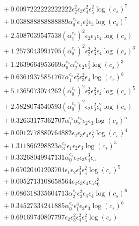 \documentclass[10pt]{article}
\begin{document}
\begin{align*}
&{}  + 0.0097222222222222 \epsilon_{2}^{2} \epsilon_{3} \epsilon_{4}^{2} \epsilon_{5}^{2} \log{\left(c_{s} \right)}^{7} \\
&{}  + 0.038888888888889 \alpha_{0}^{c_s} \epsilon_{1} \epsilon_{2}^{4} \epsilon_{3} \log{\left(c_{s} \right)}^{7} \\
&{}  + 2.5087039547538 \left(\alpha_{1}^{c_s}\right)^{2} \epsilon_{2} \epsilon_{3} \epsilon_{4} \log{\left(c_{s} \right)} \\
&{}  + 1.2573043991705 \left(\alpha_{0}^{c_s}\right)^{2} \epsilon_{2}^{2} \epsilon_{3}^{2} \epsilon_{4} \log{\left(c_{s} \right)}^{3} \\
&{}  + 1.2639664953669 \alpha_{0}^{c_s} \alpha_{2}^{c_s} \epsilon_{2} \epsilon_{3}^{2} \log{\left(c_{s} \right)}^{3} \\
&{}  + 0.63619375851767 \alpha_{1}^{c_s} \epsilon_{2}^{2} \epsilon_{3}^{2} \epsilon_{4} \log{\left(c_{s} \right)}^{6} \\
&{}  + 5.1365073074262 \left(\alpha_{0}^{c_s}\right)^{2} \epsilon_{2}^{2} \epsilon_{3}^{2} \epsilon_{4} \log{\left(c_{s} \right)}^{5} \\
&{}  + 2.5828074540593 \left(\alpha_{0}^{c_s}\right)^{2} \epsilon_{2} \epsilon_{3}^{2} \epsilon_{4}^{2} \log{\left(c_{s} \right)} \\
&{}  + 0.32633177362707 \alpha_{1}^{c_s} \alpha_{2}^{c_s} \epsilon_{2} \epsilon_{3} \log{\left(c_{s} \right)}^{5} \\
&{}  + 0.0012778880764882 \epsilon_{2} \epsilon_{3} \epsilon_{4} \epsilon_{5}^{4} \log{\left(c_{s} \right)}^{4} \\
&{}  + 1.311866298823 \alpha_{3}^{c_s} \epsilon_{1} \epsilon_{2} \epsilon_{3} \log{\left(c_{s} \right)}^{3} \\
&{}  + 0.33268049947131 \alpha_{0}^{c_s} \epsilon_{2} \epsilon_{3} \epsilon_{4}^{3} \epsilon_{5} \\
&{}  + 0.67020401203704 \epsilon_{1} \epsilon_{2} \epsilon_{3}^{3} \epsilon_{4}^{2} \log{\left(c_{s} \right)}^{5} \\
&{}  + 0.0052713108658564 \epsilon_{2} \epsilon_{3} \epsilon_{4} \epsilon_{5} \epsilon_{6}^{3} \\
&{}  + 0.086318335604713 \alpha_{2}^{c_s} \epsilon_{2}^{2} \epsilon_{3} \epsilon_{4} \log{\left(c_{s} \right)}^{6} \\
&{}  + 0.34527334241885 \alpha_{0}^{c_s} \epsilon_{1}^{4} \epsilon_{2} \epsilon_{3} \log{\left(c_{s} \right)}^{6} \\
&{}  + 0.69169740807797 \epsilon_{2} \epsilon_{3}^{2} \epsilon_{4}^{2} \epsilon_{5}^{2} \log{\left(c_{s} \right)} \\

\end{align*}
\end{document}
